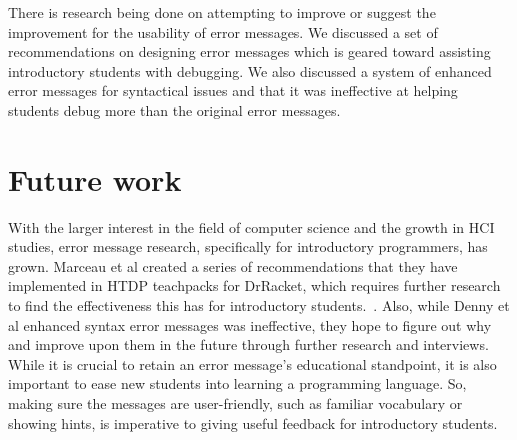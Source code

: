 \documentclass{sig-alternate}
\begin{document}
There is research being done on attempting to improve or suggest the improvement for the usability of error messages.
We discussed a set of recommendations on designing error messages which is geared toward assisting introductory students with debugging.
We also discussed a system of enhanced error messages for syntactical issues and that it was ineffective at helping students debug more than the original error messages.

\section{Future work}\label{sec:ftrwrk}

With the larger interest in the field of computer science and the growth in HCI studies, error message research, specifically for introductory programmers, has grown.
Marceau et al created a series of recommendations that they have implemented in HTDP teachpacks for DrRacket, which requires further research to find the effectiveness this has for introductory students.~\cite{htdp-teachpacks}.
Also, while Denny et al enhanced syntax error messages was ineffective, they hope to figure out why and improve upon them in the future through further research and interviews.
While it is crucial to retain an error message's educational standpoint, it is also important to ease new students into learning a programming language.
So, making sure the messages are user-friendly, such as familiar vocabulary or showing hints, is imperative to giving useful feedback for introductory students.



  

\end{document}
